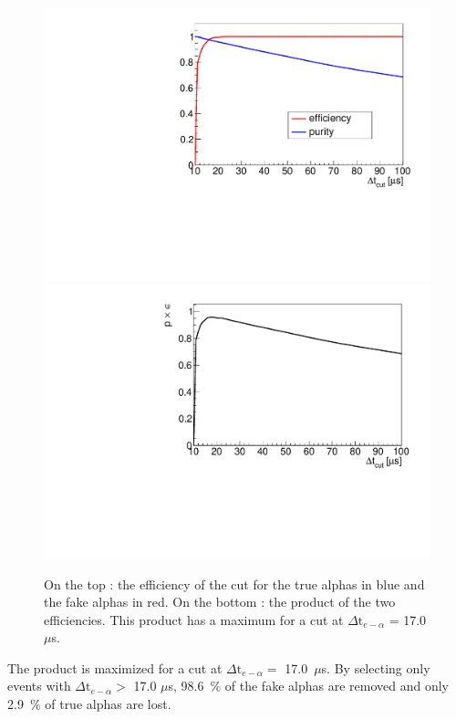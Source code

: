 \documentclass[main.tex]{subfiles}
\begin{document}
\begin{figure}[h!]
\begin{center}
\includegraphics[scale=0.4]{pictures/Chap5/efficiency_purity.pdf}
\includegraphics[scale=0.4]{pictures/Chap5/pe.pdf}
\caption{On the top : the efficiency of the cut for the true alphas in blue and the fake alphas in red. On the bottom : the product of the two efficiencies. This product has a maximum for a cut at $\Delta \text{t}_{e-\alpha}$ = 17.0 $\mu$s.}
\label{efficiency_ratio}
\end{center}
\end{figure}

\bigskip

\noindent The product is maximized for a cut at $\Delta \text{t}_{e-\alpha} =$ 17.0~$\mu$s. By selecting only events with $\Delta \text{t}_{e-\alpha} >$ 17.0 $\mu$s, 98.6~$\%$ of the fake alphas are removed and only 2.9~$\%$ of true alphas are lost.
\end{document}
